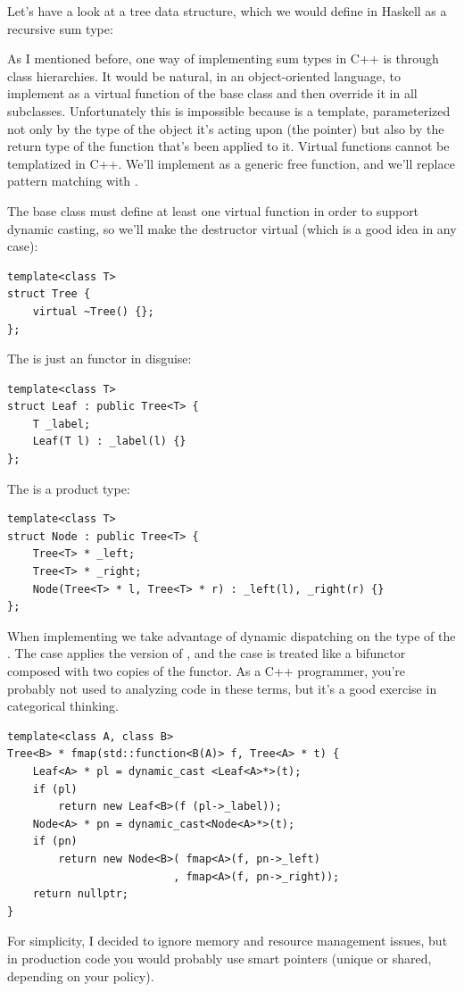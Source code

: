 Let's have a look at a tree data structure, which we would define in
Haskell as a recursive sum type:

As I mentioned before, one way of implementing sum types in C++ is
through class hierarchies. It would be natural, in an object-oriented
language, to implement  as a virtual function of the base
class  and then override it in all subclasses.
Unfortunately this is impossible because  is a template,
parameterized not only by the type of the object it's acting upon (the
 pointer) but also by the return type of the function
that's been applied to it. Virtual functions cannot be templatized in
C++. We'll implement  as a generic free function, and we'll
replace pattern matching with .

The base class must define at least one virtual function in order to
support dynamic casting, so we'll make the destructor virtual (which is
a good idea in any case):

\begin{Verbatim}
template<class T>
struct Tree { 
    virtual ~Tree() {};
};
\end{Verbatim}
The  is just an  functor in disguise:

\begin{Verbatim}
template<class T>
struct Leaf : public Tree<T> {
    T _label;
    Leaf(T l) : _label(l) {}
};
\end{Verbatim}
The  is a product type:

\begin{Verbatim}
template<class T>
struct Node : public Tree<T> {
    Tree<T> * _left;
    Tree<T> * _right;
    Node(Tree<T> * l, Tree<T> * r) : _left(l), _right(r) {}
};
\end{Verbatim}
When implementing  we take advantage of dynamic dispatching
on the type of the . The  case applies the
 version of , and the  case
is treated like a bifunctor composed with two copies of the
 functor. As a C++ programmer, you're probably not used to
analyzing code in these terms, but it's a good exercise in categorical
thinking.

\begin{Verbatim}
template<class A, class B>
Tree<B> * fmap(std::function<B(A)> f, Tree<A> * t) {
    Leaf<A> * pl = dynamic_cast <Leaf<A>*>(t);
    if (pl)
        return new Leaf<B>(f (pl->_label));
    Node<A> * pn = dynamic_cast<Node<A>*>(t);
    if (pn)
        return new Node<B>( fmap<A>(f, pn->_left) 
                          , fmap<A>(f, pn->_right));
    return nullptr;
}
\end{Verbatim}
For simplicity, I decided to ignore memory and resource management
issues, but in production code you would probably use smart pointers
(unique or shared, depending on your policy).

